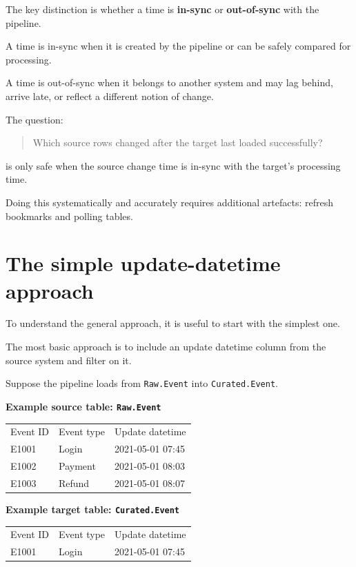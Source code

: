 \documentclass[10pt,openany,10pt]{book}
\newcounter{none}
\let\podeToprule\toprule
\let\podeMidrule\midrule
\let\podeBottomrule\bottomrule
\renewcommand{\toprule}{\arrayrulecolor{pbiGrid}\podeToprule}
\renewcommand{\midrule}{\arrayrulecolor{pbiGrid}\podeMidrule}
\renewcommand{\bottomrule}{\arrayrulecolor{pbiGrid}\podeBottomrule}
\begin{document}
The key distinction is whether a time is \textbf{in-sync} or
\textbf{out-of-sync} with the pipeline.

A time is in-sync when it is created by the pipeline or can be safely
compared for processing.

A time is out-of-sync when it belongs to another system and may lag
behind, arrive late, or reflect a different notion of change.

The question:

\begin{quote}
Which source rows changed after the target last loaded successfully?
\end{quote}

is only safe when the source change time is in-sync with the target's
processing time.

Doing this systematically and accurately requires additional artefacts:
refresh bookmarks and polling tables.

\section{The simple update-datetime
approach}\label{the-simple-update-datetime-approach}

To understand the general approach, it is useful to start with the
simplest one.

The most basic approach is to include an update datetime column from the
source system and filter on it.

Suppose the pipeline loads from \texttt{Raw.Event} into
\texttt{Curated.Event}.

\textbf{Example source table: \texttt{Raw.Event}}

{\def\LTcaptype{none} %
\begin{longtable}[]{@{}lll@{}}
\toprule\noalign{}
Event ID & Event type & Update datetime \\
\midrule\noalign{}
\endhead
\bottomrule\noalign{}
\endlastfoot
E1001 & Login & 2021-05-01 07:45 \\
E1002 & Payment & 2021-05-01 08:03 \\
E1003 & Refund & 2021-05-01 08:07 \\
\end{longtable}
}

\textbf{Example target table: \texttt{Curated.Event}}

{\def\LTcaptype{none} %
\begin{longtable}[]{@{}lll@{}}
\toprule\noalign{}
Event ID & Event type & Update datetime \\
\midrule\noalign{}
\endhead
\bottomrule\noalign{}
\endlastfoot
E1001 & Login & 2021-05-01 07:45 \\
\end{longtable}
}
\end{document}
